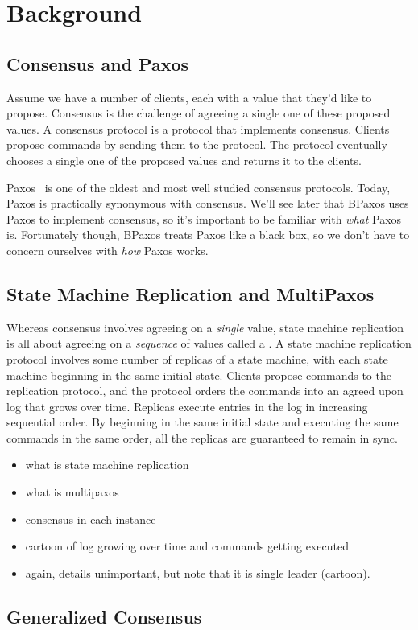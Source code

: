 \section{Background}

\subsection{Consensus and Paxos}
Assume we have a number of clients, each with a value that they'd like to
propose. Consensus is the challenge of agreeing a single one of these proposed
values. A consensus protocol is a protocol that implements consensus. Clients
propose commands by sending them to the protocol. The protocol eventually
chooses a single one of the proposed values and returns it to the clients.

Paxos~\cite{lamport2001paxos, lamport2001paxos, van2015paxos, lampson2001abcd,
mazieres2007paxos} is one of the oldest and most well studied consensus
protocols. Today, Paxos is practically synonymous with consensus. We'll see
later that BPaxos uses Paxos to implement consensus, so it's important to be
familiar with \emph{what} Paxos is. Fortunately though, BPaxos treats Paxos
like a black box, so we don't have to concern ourselves with \emph{how} Paxos
works.

\subsection{State Machine Replication and MultiPaxos}
Whereas consensus involves agreeing on a \emph{single} value, state machine
replication is all about agreeing on a \emph{sequence} of values called a
. A state machine replication protocol involves some number of
replicas of a state machine, with each state machine beginning in the same
initial state. Clients propose commands to the replication protocol, and the
protocol orders the commands into an agreed upon log that grows over time.
Replicas execute entries in the log in increasing sequential order. By
beginning in the same initial state and executing the same commands in the same
order, all the replicas are guaranteed to remain in sync.

\begin{itemize}
  \item what is state machine replication
  \item what is multipaxos
  \item consensus in each instance
  \item cartoon of log growing over time and commands getting executed
  \item again, details unimportant, but note that it is single leader (cartoon).
\end{itemize}

{}

\subsection{Generalized Consensus}
